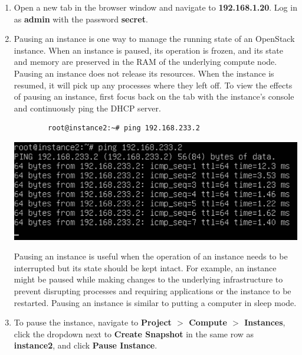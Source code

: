 \documentclass[letterpaper, 12pt]{article}
\begin{document}
\begin{enumerate}
    \item Open a new tab in the browser window and navigate to \textbf{192.168.1.20}. Log in as \textbf{admin} with the
    password \textbf{secret}.

    \item Pausing an instance is one way to manage the running state of an OpenStack instance. When an instance is
    paused, its operation is frozen, and its state and memory are preserved in the RAM of the underlying compute node.
    Pausing an instance does not release its resources. When the instance is resumed, it will pick up any processes
    where they left off. To view the effects of pausing an instance, first focus back on the tab with the instance's
    console and continuously ping the DHCP server.
    \begin{lstlisting}
        root@instance2:~# ping 192.168.233.2
    \end{lstlisting} 
    
    \begin{center}
        \includegraphics[width=\linewidth]{images/part3/step2.png}
    \end{center}

    \begin{tipbox}
        Pausing an instance is useful when the operation of an instance needs to be interrupted but its state should be
        kept intact. For example, an instance might be paused while making changes to the underlying infrastructure
        to prevent disrupting processes and requiring applications or the instance to be restarted. Pausing an instance
        is similar to putting a computer in sleep mode.
    \end{tipbox}

    \item To pause the instance, navigate to \textbf{Project $>$ Compute $>$ Instances}, click the dropdown next to
    \textbf{Create Snapshot} in the same row as \textbf{instance2}, and click \textbf{Pause Instance}.


\end{enumerate}
\end{document}
